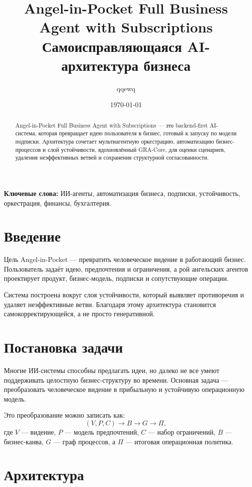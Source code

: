 \documentclass[11pt,a4paper]{article}
\title{Angel-in-Pocket Full Business Agent with Subscriptions\\
Самоисправляющаяся AI-архитектура бизнеса}
\author{qqewq}
\date{\today}
\begin{document}
\maketitle

\begin{abstract}
Angel-in-Pocket Full Business Agent with Subscriptions — это backend-first AI-система, которая превращает идею пользователя в бизнес, готовый к запуску по модели подписки. Архитектура сочетает мультиагентную оркестрацию, автоматизацию бизнес-процессов и слой устойчивости, вдохновлённый GRA-Core, для оценки сценариев, удаления неэффективных ветвей и сохранения структурной согласованности.
\end{abstract}

\noindent\textbf{Ключевые слова:} ИИ-агенты, автоматизация бизнеса, подписки, устойчивость, оркестрация, финансы, бухгалтерия.

\section{Введение}

Цель Angel-in-Pocket — превратить человеческое видение в работающий бизнес. Пользователь задаёт идею, предпочтения и ограничения, а рой ангельских агентов проектирует продукт, бизнес-модель, подписки и сопутствующие операции.

Система построена вокруг слоя устойчивости, который выявляет противоречия и удаляет неэффективные ветви. Благодаря этому архитектура становится самокорректирующейся, а не просто генеративной.

\section{Постановка задачи}

Многие ИИ-системы способны предлагать идеи, но далеко не все умеют поддерживать целостную бизнес-структуру во времени. Основная задача — преобразовать человеческое видение в прибыльную и устойчивую операционную модель.

Это преобразование можно записать как:
\[
(V, P, C) \rightarrow B \rightarrow G \rightarrow \Pi,
\]
где $V$ — видение, $P$ — модель предпочтений, $C$ — набор ограничений, $B$ — бизнес-канва, $G$ — граф процессов, а $\Pi$ — итоговая операционная политика.

\section{Архитектура}
\end{document}
